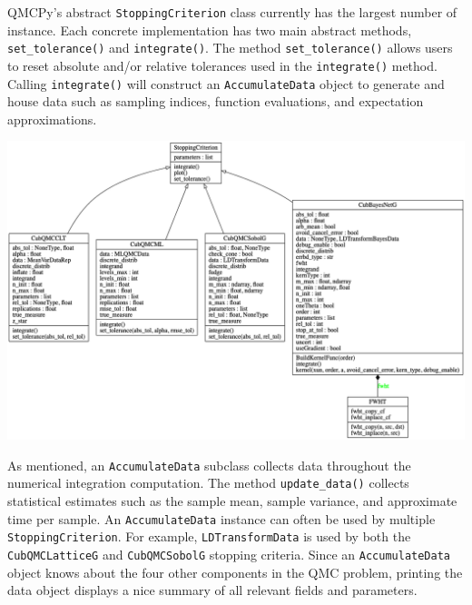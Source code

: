 QMCPy's abstract \texttt{StoppingCriterion} class currently has the largest number of instance. Each concrete implementation has two main abstract methods, \texttt{set\_tolerance()} and \texttt{integrate()}. The method \texttt{set\_tolerance()}  allows users to reset absolute and/or relative tolerances used in the \texttt{integrate()} method. Calling \texttt{integrate()} will construct an \texttt{AccumulateData} object to generate and house data such as sampling indices, function evaluations, and expectation approximations.

\begin{center}
\includegraphics[width=1\textwidth]{uml/stopping_criterion_blog_uml.png}  
\end{center} 


As mentioned, an \texttt{AccumulateData} subclass collects data throughout the numerical integration computation. The method \texttt{update\_data()} collects statistical estimates such as the sample mean, sample variance, and approximate time per sample. An \texttt{AccumulateData} instance can often be used by multiple \texttt{StoppingCriterion}. For example, \texttt{LDTransformData} is used by both the \texttt{CubQMCLatticeG} and \texttt{CubQMCSobolG} stopping criteria. Since an \texttt{AccumulateData} object knows about the four other components in the QMC problem, printing the data object displays a nice summary of all relevant fields and parameters. 

